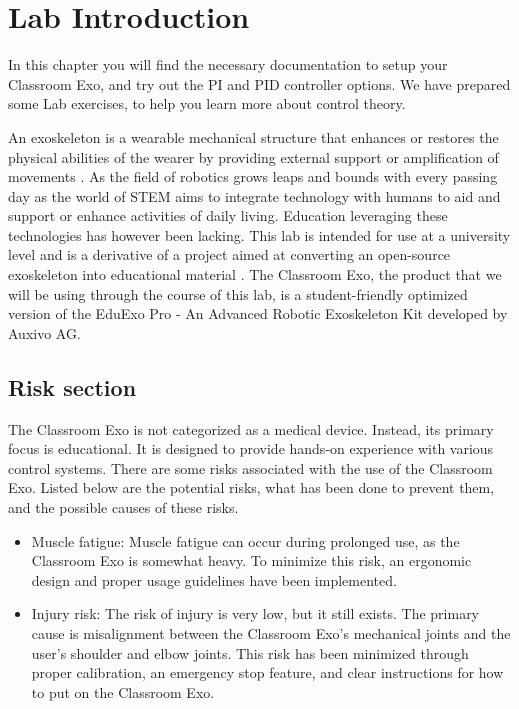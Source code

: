 

\section{Lab Introduction}

\begin{tcolorbox}[colback=blue!5!white,colframe=blue!75!black,title=Summary]
	In this chapter you will find the necessary documentation to setup your Classroom Exo, and try out the PI and PID controller options. We have prepared some Lab exercises, to help you learn more about control theory.
\end{tcolorbox}
\vspace{0.5cm}
 
An exoskeleton is a wearable mechanical structure that enhances or restores the physical abilities of the wearer by providing external support or amplification of movements \cite{AlTashi2024}. As the field of robotics grows leaps and bounds with every passing day as the world of STEM aims to integrate technology with humans to aid and support or enhance activities of daily living. Education leveraging these technologies has however been lacking. 
This lab is intended for use at a university level and is a derivative of a project aimed at converting an open-source exoskeleton into educational material \cite{AlTashi2024}. The Classroom Exo, the product that we will be using through the course of this lab, is a student-friendly optimized version of the EduExo Pro - An Advanced Robotic Exoskeleton Kit developed by Auxivo AG. 

\subsection{Risk section}
The Classroom Exo is not categorized as a medical device. Instead, its primary focus is educational. It is designed to provide hands-on experience with various control systems. There are some risks associated with the use of the Classroom Exo. Listed below are the potential risks, what has been done to prevent them, and the possible causes of these risks.
\begin{itemize}[]
	\item Muscle fatigue: Muscle fatigue can occur during prolonged use, as the Classroom Exo is somewhat heavy. To minimize this risk, an ergonomic design and proper usage guidelines have been implemented.
	\item Injury risk: The risk of injury is very low, but it still exists. The primary cause is misalignment between the Classroom Exo's mechanical joints and the user's shoulder and elbow joints. This risk has been minimized through proper calibration, an emergency stop feature, and clear instructions for how to put on the Classroom Exo.
\end{itemize}
	
